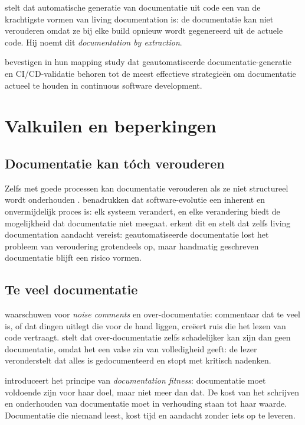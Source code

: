 \textcite{martraire2019livingdocumentation} stelt dat automatische generatie van documentatie uit code een van de krachtigste vormen van living documentation is: de documentatie kan niet verouderen omdat ze bij elke build opnieuw wordt gegenereerd uit de actuele code. Hij noemt dit \textit{documentation by extraction}.

\textcite{theunissen2022mappingdocumentation} bevestigen in hun mapping study dat geautomatiseerde documentatie-generatie en CI/CD-validatie behoren tot de meest effectieve strategieën om documentatie actueel te houden in continuous software development.

\section{Valkuilen en beperkingen}
\label{sec:cad-valkuilen}

\subsection{Documentatie kan tóch verouderen}
Zelfs met goede processen kan documentatie verouderen als ze niet structureel wordt onderhouden \autocite{tripathy2014softwareevolution}. \textcite{tripathy2014softwareevolution} benadrukken dat software-evolutie een inherent en onvermijdelijk proces is: elk systeem verandert, en elke verandering biedt de mogelijkheid dat documentatie niet meegaat. \textcite{martraire2019livingdocumentation} erkent dit en stelt dat zelfs living documentation aandacht vereist: geautomatiseerde documentatie lost het probleem van veroudering grotendeels op, maar handmatig geschreven documentatie blijft een risico vormen.

\subsection{Te veel documentatie}
\textcite{boswell2011readablecode} waarschuwen voor \textit{noise comments} en over-documentatie: commentaar dat te veel is, of dat dingen uitlegt die voor de hand liggen, creëert ruis die het lezen van code vertraagt. \textcite{martin2008clean} stelt dat over-documentatie zelfs schadelijker kan zijn dan geen documentatie, omdat het een valse zin van volledigheid geeft: de lezer veronderstelt dat alles is gedocumenteerd en stopt met kritisch nadenken.

\textcite{ruping2005agiledocumentation} introduceert het principe van \textit{documentation fitness}: documentatie moet voldoende zijn voor haar doel, maar niet meer dan dat. De kost van het schrijven en onderhouden van documentatie moet in verhouding staan tot haar waarde. Documentatie die niemand leest, kost tijd en aandacht zonder iets op te leveren.

